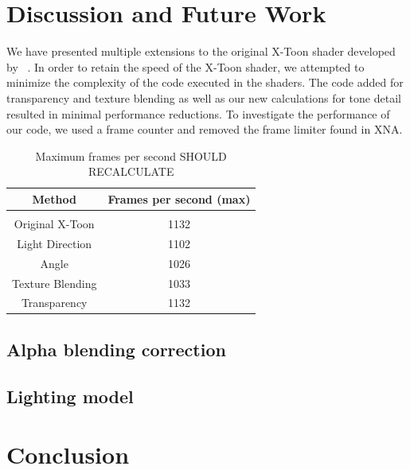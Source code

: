 \documentclass[annual]{acmsiggraph}
\begin{document}
\section{Discussion and Future Work}
\label{sec:discussion}
We have presented multiple extensions to the original X-Toon shader developed by  ~\cite{BTM06a}.  In order to retain the speed of the X-Toon shader, we attempted to minimize the complexity of the code executed in the shaders. The code added for transparency and texture blending as well as our new calculations for tone detail resulted in minimal performance reductions. To investigate the performance of our code, we used a frame counter and removed the frame limiter found in XNA.

\begin{table}
	\centering
	\label{tab:fps}
	\caption{Maximum frames per second SHOULD RECALCULATE}
	\begin{tabular}{cc}
		\hline
    		Method  & Frames per second (max) \\
		\hline\hline \\
    		Original X-Toon  & 1132                       \\
    		Light Direction & 1102                      \\
		Angle & 1026 \\
		Texture Blending & 1033 \\
		Transparency & 1132 \\
		\hline
	\end{tabular}
\end{table}

\subsection{Alpha blending correction}

\subsection{Lighting model}

\section{Conclusion}
\label{sec:conclusion}




\end{document}
